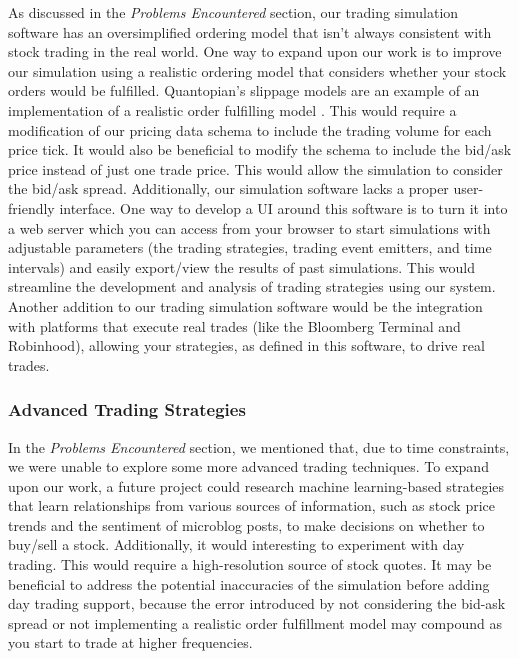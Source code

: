 As discussed in the \textit{Problems Encountered} section, our trading simulation software has an oversimplified ordering model that isn't always consistent with stock trading in the real world.
One way to expand upon our work is to improve our simulation using a realistic ordering model that considers whether your stock orders would be fulfilled.
Quantopian's slippage models are an example of an implementation of a realistic order fulfilling model \cite{quantopianSlippage}.
This would require a modification of our pricing data schema to include the trading volume for each price tick.
It would also be beneficial to modify the schema to include the bid/ask price instead of just one trade price.
This would allow the simulation to consider the bid/ask spread.
Additionally, our simulation software lacks a proper user-friendly interface.
One way to develop a UI around this software is to turn it into a web server which you can access from your browser to start simulations with adjustable parameters (the trading strategies, trading event emitters, and time intervals) and easily export/view the results of past simulations.
This would streamline the development and analysis of trading strategies using our system.
Another addition to our trading simulation software would be the integration with platforms that execute real trades (like the Bloomberg Terminal\cite{terminal} and Robinhood\cite{robinhood}), allowing your strategies, as defined in this software, to drive real trades.

\subsubsection{Advanced Trading Strategies}

In the \textit{Problems Encountered} section, we mentioned that, due to time constraints, we were unable to explore some more advanced trading techniques.
To expand upon our work, a future project could research machine learning-based strategies that learn relationships from various sources of information, such as stock price trends and the sentiment of microblog posts, to make decisions on whether to buy/sell a stock.
Additionally, it would interesting to experiment with day trading.
This would require a high-resolution source of stock quotes.
It may be beneficial to address the potential inaccuracies of the simulation before adding day trading support, because the error introduced by not considering the bid-ask spread or not implementing a realistic order fulfillment model may compound as you start to trade at higher frequencies.

